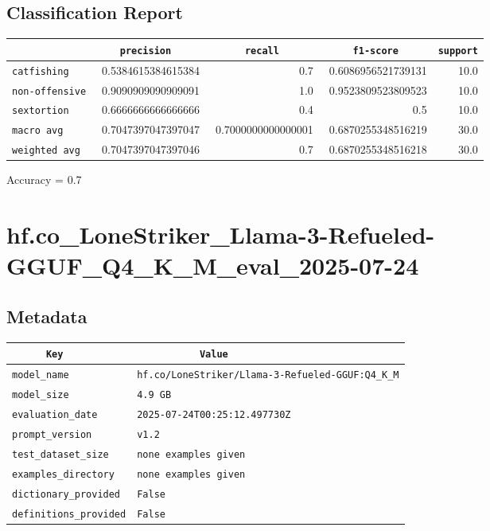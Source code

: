 \documentclass{article}
\begin{document}
\subsection{Classification Report}

\begin{center}
\begin{tabular}{l | r | r | r | r} \hline
    \verb|            | & \verb|    precision     | & \verb|      recall      | & \verb|     f1-score     | & \verb|support| \\ \hline
    \hline
    \verb|catfishing | & 0.5384615384615384 & 0.7 & 0.6086956521739131 &    10.0 \\ \hline
    \verb|non-offensive| & 0.9090909090909091 & 1.0 & 0.9523809523809523 &    10.0 \\ \hline
    \verb|sextortion | & 0.6666666666666666 & 0.4 & 0.5 &    10.0 \\ \hline
    \verb|macro avg  | & 0.7047397047397047 & 0.7000000000000001 & 0.6870255348516219 &    30.0 \\ \hline
    \verb|weighted avg| & 0.7047397047397046 & 0.7 & 0.6870255348516218 &    30.0 \\ \hline
\end{tabular}
\end{center}

\begin{center}
Accuracy = 0.7
\end{center}

\section{hf.co\_LoneStriker\_Llama-3-Refueled-GGUF\_Q4\_K\_M\_eval\_2025-07-24}
\subsection{Metadata}

\begin{center}
\begin{tabular}{l | l} \hline
    \verb|      Key      | & \verb|           Value           | \\ \hline
    \hline
    \verb|model_name    | & \verb|hf.co/LoneStriker/Llama-3-Refueled-GGUF:Q4_K_M| \\ \hline
    \verb|model_size    | & \verb|4.9 GB                       | \\ \hline
    \verb|evaluation_date| & \verb|2025-07-24T00:25:12.497730Z  | \\ \hline
    \verb|prompt_version| & \verb|v1.2                         | \\ \hline
    \verb|test_dataset_size| & \verb|none examples given          | \\ \hline
    \verb|examples_directory| & \verb|none examples given          | \\ \hline
    \verb|dictionary_provided| & \verb|False                        | \\ \hline
    \verb|definitions_provided| & \verb|False                        | \\ \hline
\end{tabular}
\end{center}
\end{document}
